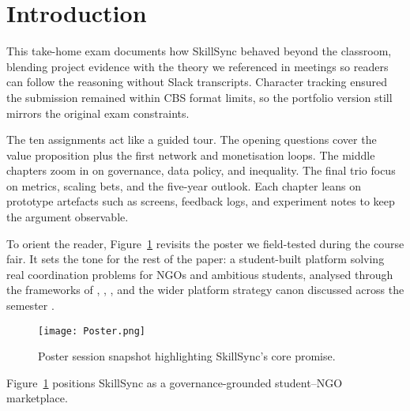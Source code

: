 \documentclass[12pt,a4paper]{article}
\begin{document}
\tableofcontents
\newpage

\section*{Introduction}
This take-home exam documents how SkillSync behaved beyond the classroom, blending project evidence with the theory we referenced in meetings so readers can follow the reasoning without Slack transcripts. Character tracking ensured the submission remained within CBS format limits, so the portfolio version still mirrors the original exam constraints.

The ten assignments act like a guided tour. The opening questions cover the value proposition plus the first network and monetisation loops. The middle chapters zoom in on governance, data policy, and inequality. The final trio focus on metrics, scaling bets, and the five-year outlook. Each chapter leans on prototype artefacts such as screens, feedback logs, and experiment notes to keep the argument observable.

To orient the reader, Figure~\ref{fig:intro-showcase} revisits the poster we field-tested during the course fair. It sets the tone for the rest of the paper: a student-built platform solving real coordination problems for NGOs and ambitious students, analysed through the frameworks of \citet{Choudary2016}, \citet{Srnicek2017}, \citet{Reillier2017}, and the wider platform strategy canon discussed across the semester \citep{Lecture01,Lecture03,Lecture05}.

\begin{figure}[H]
  \centering
  \texttt{[image: Poster.png]}
  \caption{Poster session snapshot highlighting SkillSync's core promise.}
  \label{fig:intro-showcase}
\end{figure}

Figure~\ref{fig:intro-showcase} positions SkillSync as a governance-grounded student--NGO marketplace.












\newpage


\end{document}
